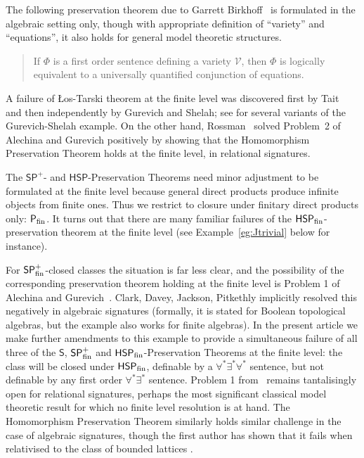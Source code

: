 \documentclass[reqno]{amsart}
\theoremstyle{plain}
\theoremstyle{definition}
\begin{document}
The following preservation theorem due to Garrett Birkhoff~\cite{bir} is formulated in the algebraic setting only, though with appropriate definition of ``variety'' and ``equations'', it also holds for general model theoretic structures.
\medskip

\begin{quotation}
If $\Phi$ is a first order sentence defining a variety $\mathscr{V}$, then $\Phi$ is logically equivalent to a universally quantified conjunction of equations.
\end{quotation}
A failure of {\L}os-Tarski theorem at the finite level was discovered first by Tait~\cite{tai} and then independently by Gurevich and Shelah; see \cite{alegur} for several variants of the Gurevich-Shelah example.  On the other hand, Rossman~\cite{ros} solved Problem~2 of Alechina and Gurevich \cite{alegur} positively by showing that the Homomorphism Preservation Theorem holds at the finite level, in relational signatures.  

The $\mathsf{SP}^+$\!- and $\mathsf{HSP}$-Preservation Theorems need minor adjustment to be formulated at the finite level because general direct products produce infinite objects from finite ones.  
Thus we restrict to closure under finitary direct products only: $\mathsf{P}_{\rm fin}$.  It turns out that there are many familiar failures of the $\mathsf{HSP}_{\rm fin}$-preservation theorem at the finite level (see Example~\ref{eg:Jtrivial} below for instance).  

For $\mathsf{SP}_{\rm fin}^+$\!-closed classes the situation is far less clear, and the possibility of the corresponding preservation theorem holding at the finite level is Problem 1 of Alechina and Gurevich~\cite{alegur}.   Clark, Davey, Jackson, Pitkethly \cite[Theorem~4.2]{CDJP} implicitly resolved this negatively in algebraic signatures (formally, it is stated for Boolean topological algebras, but the example also works for finite algebras).  
In the present article we make further amendments to this example to provide a simultaneous failure of all three of the $\mathsf{S}$, $\mathsf{SP}_{\rm fin}^+$ and $\mathsf{HSP}_{\rm fin}$-Preservation Theorems at the finite level: the class will be closed under $\mathsf{HSP}_{\rm fin}$, definable by a $\forall^*\exists^*\forall^*$ sentence, but not definable by any first order $\forall^*\exists^*$ sentence.
Problem 1 from~\cite{alegur} remains tantalisingly open for relational signatures, perhaps the most significant classical model theoretic result for which no finite level resolution is at hand.  The Homomorphism Preservation Theorem similarly holds similar challenge in the case of algebraic signatures, though the first author has shown that it fails when relativised to the class of bounded lattices \cite{ham}.
\end{document}
